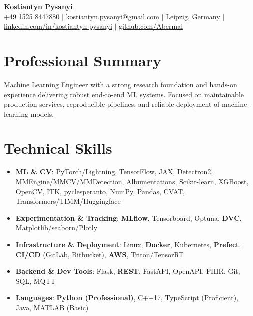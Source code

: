 \documentclass[letterpaper,10pt]{article}
\newcommand{\resumeItem}[1]{
    \item\small{#1}\vspace{-0.5pt}
}
\newcommand{\resumeSubHeadingList}{\begin{itemize}[leftmargin=0.15in, label={}]\vspace{-2pt}}
\newcommand{\resumeSubHeadingListEnd}{\end{itemize}}
\begin{document}
\begin{center}
  \textbf{\Huge Kostiantyn Pysanyi}\vspace{4pt} \\
  \small +49 1525 8447880 $|$ \href{mailto:kostiantyn.pysanyi@gmail.com}{kostiantyn.pysanyi@gmail.com} $|$ Leipzig, Germany $|$
  \href{https://www.linkedin.com/in/kostiantyn-pysanyi/}{linkedin.com/in/kostiantyn-pysanyi} $|$ \href{https://github.com/Abermal}{github.com/Abermal}
\end{center}


\section{Professional Summary}
Machine Learning Engineer with a strong research foundation and hands-on experience delivering robust end-to-end ML systems. Focused on maintainable production services, reproducible pipelines, and reliable deployment of machine-learning models.

\section{Technical Skills}
\resumeSubHeadingList
  \resumeItem{\textbf{ML \& CV}: PyTorch/Lightning, TensorFlow, JAX, Detectron2, MMEngine/MMCV/MMDetection, Albumentations, Scikit-learn, XGBoost, OpenCV, ITK, pyclesperanto, NumPy, Pandas, CVAT, Transformers/TIMM/Huggingface}
  \resumeItem{\textbf{Experimentation \& Tracking}: \textbf{MLflow}, Tensorboard, Optuna, \textbf{DVC}, Matplotlib/seaborn/Plotly}
  \resumeItem{\textbf{Infrastructure \& Deployment}: Linux, \textbf{Docker}, Kubernetes, \textbf{Prefect}, \textbf{CI/CD} (GitLab, Bitbucket), \textbf{AWS}, Triton/TensorRT}
  \resumeItem{\textbf{Backend \& Dev Tools}: Flask, \textbf{REST}, FastAPI, OpenAPI, FHIR, Git, SQL, MQTT}
  \resumeItem{\textbf{Languages}: \textbf{Python (Professional)}, C++17, TypeScript (Proficient), Java, MATLAB (Basic)}
\resumeSubHeadingListEnd
\end{document}
